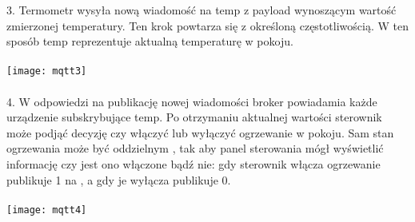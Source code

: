 3. Termometr wysyła nową wiadomość na  temp z payload wynoszącym wartość zmierzonej temperatury. Ten krok powtarza się z określoną częstotliwością. W ten sposób  temp reprezentuje aktualną temperaturę w pokoju.\\\\
\texttt{[image: mqtt3]}\\\\

4. W odpowiedzi na publikację nowej wiadomości broker powiadamia każde urządzenie subskrybujące  temp. Po otrzymaniu aktualnej wartości sterownik może podjąć decyzję czy włączyć lub wyłączyć ogrzewanie w pokoju. Sam stan ogrzewania może być oddzielnym , tak aby panel sterowania mógł wyświetlić informację czy jest ono włączone bądź nie: gdy sterownik włącza ogrzewanie publikuje 1 na  , a gdy je wyłącza publikuje 0.\\\\
\texttt{[image: mqtt4]}\\\\